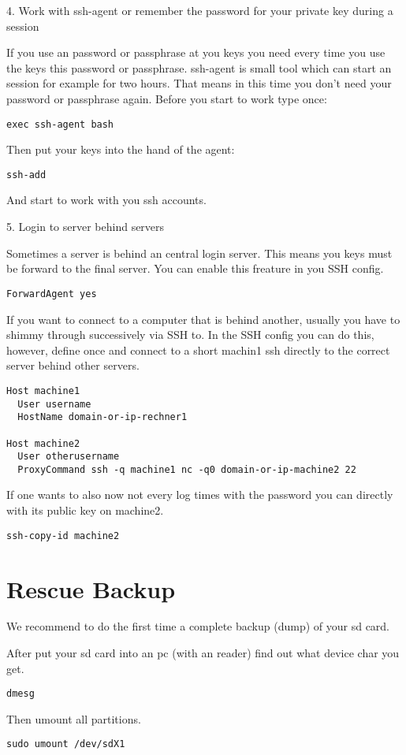 4. Work with ssh-agent or remember the password for your private key during a session

If you use an password or passphrase at you keys you need every time you use the keys this password or passphrase. ssh-agent is small tool which can start an session for example for two hours. That means in this time you don't need your password or passphrase again. Before you start to work type once:

\texttt{exec ssh-agent bash}

Then put your keys into the hand of the agent:

\texttt{ssh-add}

And start to work with you ssh accounts. 

5. Login to server behind servers

Sometimes a server is behind an central login server. This means you keys must be forward to the final server. You can enable this freature in you SSH config.

\texttt{ForwardAgent yes}

If you want to connect to a computer that is behind another, usually you have to shimmy through successively via SSH to. In the SSH config you can do this, however, define once and connect to a short machin1 ssh directly to the correct server behind other servers.


\begin{lstlisting}
Host machine1
  User username
  HostName domain-or-ip-rechner1

Host machine2
  User otherusername
  ProxyCommand ssh -q machine1 nc -q0 domain-or-ip-machine2 22
\end{lstlisting}

If one wants to also now not every log times with the password you can directly with its public key on machine2.

\texttt{ssh-copy-id machine2}


\section{Rescue Backup}


We recommend to do the first time a complete backup (dump) of your sd card.

After put your sd card into an pc (with an reader) find out what
device char you get.

\texttt{dmesg}

Then umount all partitions.

\texttt{sudo umount /dev/sdX1}

